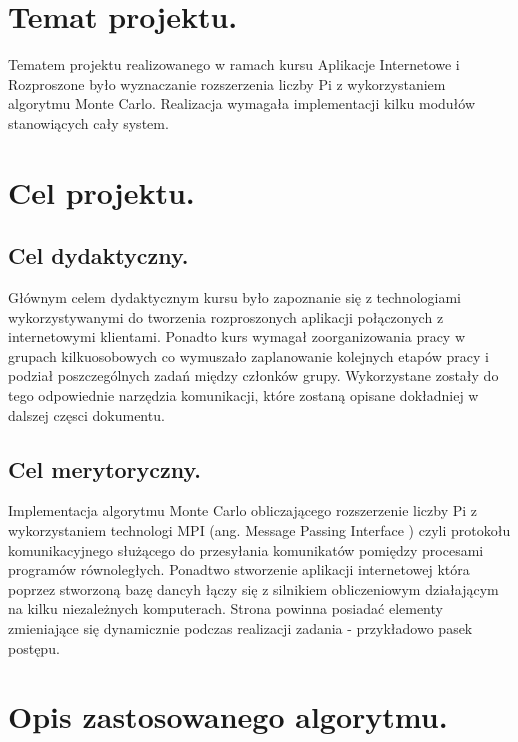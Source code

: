 \documentclass[a4paper,12pt]{article}		%
\begin{document}

\newpage
\tableofcontents
\newpage


\section{Temat projektu.}
Tematem projektu realizowanego w ramach kursu Aplikacje Internetowe i Rozproszone było wyznaczanie rozszerzenia liczby Pi z wykorzystaniem algorytmu Monte Carlo. Realizacja wymagała implementacji kilku modułów stanowiących cały system.
\section{Cel projektu.}
\subsection{Cel dydaktyczny.}
Głównym celem dydaktycznym kursu było zapoznanie się z technologiami wykorzystywanymi do tworzenia rozproszonych aplikacji połączonych z internetowymi klientami. Ponadto kurs wymagał zoorganizowania pracy w grupach kilkuosobowych co wymuszało zaplanowanie kolejnych etapów pracy i podział poszczególnych zadań między członków grupy. Wykorzystane zostały do tego odpowiednie narzędzia komunikacji, które zostaną opisane dokładniej w dalszej częsci dokumentu. 
\subsection{Cel merytoryczny.}
Implementacja algorytmu Monte Carlo obliczającego rozszerzenie liczby Pi z wykorzystaniem technologi MPI (ang. Message Passing Interface ) czyli protokołu komunikacyjnego służącego do przesyłania komunikatów pomiędzy procesami programów równoległych. Ponadtwo stworzenie aplikacji internetowej która poprzez stworzoną bazę dancyh łączy się z silnikiem obliczeniowym działającym na kilku niezależnych komputerach. Strona powinna posiadać elementy zmieniające się dynamicznie podczas realizacji zadania - przykładowo pasek postępu. 
\newpage
\section{Opis zastosowanego algorytmu.}
\end{document}
